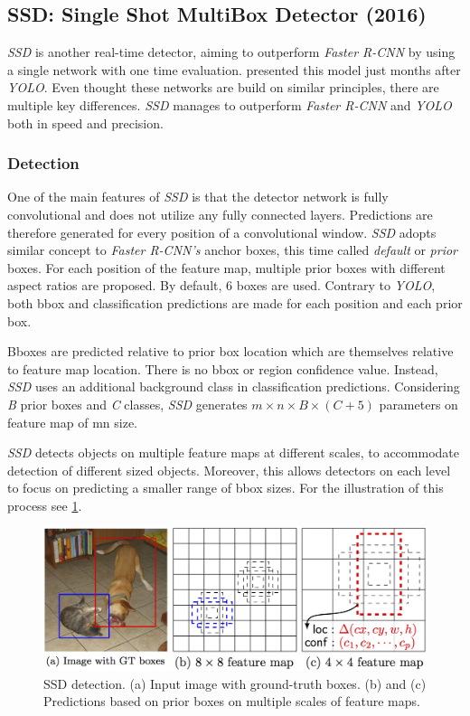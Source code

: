 \subsection{SSD: Single Shot MultiBox Detector (2016)}
\label{sec:ssd}
\textit{SSD} is another real-time detector, aiming to outperform \textit{Faster R-CNN} by using a single network with one time evaluation. \citeauthor{bib:ssd} \cite{bib:ssd} presented this model just months after \textit{YOLO}. Even thought these networks are build on similar principles, there are multiple key differences. \textit{SSD} manages to outperform \textit{Faster R-CNN} and \textit{YOLO} both in speed and precision.

\subsubsection{Detection}
One of the main features of \textit{SSD} is that the detector network is fully convolutional and does not utilize any fully connected layers. Predictions are therefore generated for every position of a convolutional window. \textit{SSD} adopts similar concept to \textit{Faster R-CNN's} anchor boxes, this time called \textit{default} or \textit{prior} boxes. For each position of the feature map, multiple prior boxes with different aspect ratios are proposed. By default, 6 boxes are used. Contrary to \textit{YOLO}, both bbox and classification predictions are made for each position and each prior box.

Bboxes are predicted relative to prior box location which are themselves relative to feature map location. There is no bbox or region confidence value. Instead, \textit{SSD} uses an additional background class in classification predictions. Considering \textit{B} prior boxes and \textit{C} classes, \textit{SSD} generates $m\times n\times B\times (C+5)$ parameters on feature map of m\x n size.

\textit{SSD} detects objects on multiple feature maps at different scales, to accommodate detection of different sized objects. Moreover, this allows detectors on each level to focus on predicting a smaller range of bbox sizes. For the illustration of this process see \cref{fig:ssddet}.

\begin{figure}
    \centering
    \includegraphics[width=\textwidth]{img/ssddet}
    \caption{SSD detection. (a) Input image with ground-truth boxes. (b) and (c) Predictions based on prior boxes on multiple scales of feature maps.}
    \label{fig:ssddet}
\end{figure}

